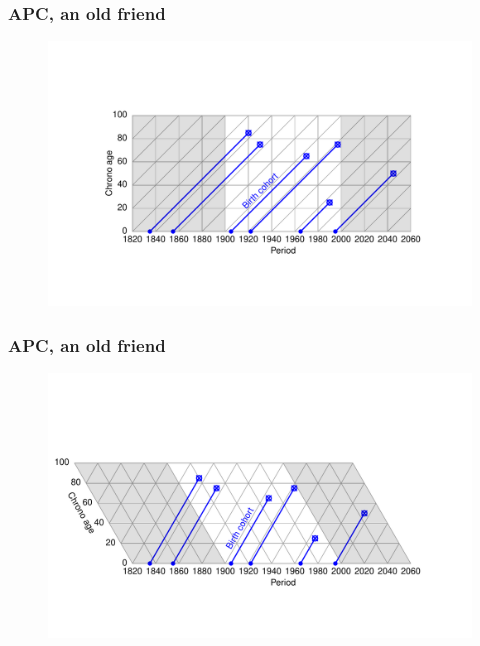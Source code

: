 \documentclass[20pt]{beamer}
\begin{document}
\begin{frame}
\frametitle{APC, an old friend}
\begin{figure}[b]
    \centering
    \includegraphics{Figures/LabPres/APC4.pdf}
\end{figure} 
\end{frame}

\begin{frame}
\frametitle{APC, an old friend}
\begin{figure}[b]
    \centering
    \includegraphics{Figures/LabPres/APC5.pdf}
\end{figure} 
\end{frame}
\end{document}

